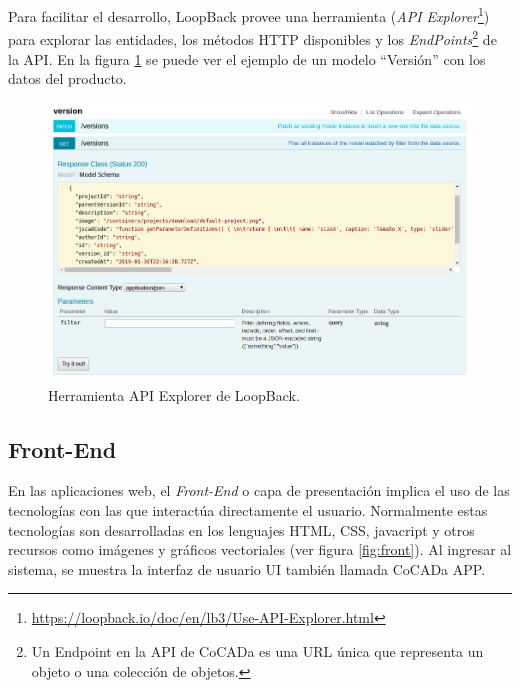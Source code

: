 Para facilitar el desarrollo, LoopBack provee una herramienta (\textit{\Gls{API Explorer}}\footnote{\url{https://loopback.io/doc/en/lb3/Use-API-Explorer.html}}) para explorar las entidades, los métodos \Gls{HTTP} disponibles y los \textit{\Gls{EndPoints}}\footnote{Un Endpoint en la API de CoCADa es una URL única que representa un objeto o una colección de objetos.} de la API. En la figura \ref{fig:explorer} se puede ver el ejemplo de un modelo ``Versión'' con los datos del producto.

\begin{figure}[ht]
    \includegraphics[width=14cm]{Img/Desarrollo/strong.jpg}
    \centering
    \caption{\footnotesize{Herramienta API Explorer de LoopBack.}}
    \label{fig:explorer}
\end{figure}

\subsection{Front-End}
\label{front}
En las aplicaciones web, el \textit{Front-End} o capa de presentación implica el uso de las tecnologías con las que interactúa directamente el usuario. Normalmente estas tecnologías son desarrolladas en los lenguajes HTML, CSS, javacript y otros recursos como imágenes y gráficos vectoriales (ver figura \ref{fig:front}). Al ingresar al sistema, se muestra la interfaz de usuario UI también llamada CoCADa \Gls{APP}.

